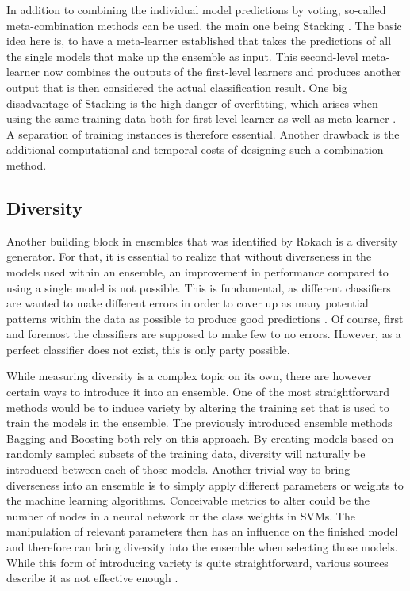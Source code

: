 In addition to combining the individual model predictions by voting, so-called meta-combination methods can be used, the main one being Stacking \cite{rokach2010}. The basic idea here is, to have a meta-learner established that takes the predictions of all the single models that make up the ensemble as input. This second-level meta-learner now combines the outputs of the first-level learners and produces another output that is then considered the actual classification result. One big disadvantage of Stacking is the high danger of overfitting, which arises when using the same training data both for first-level learner as well as meta-learner \cite{zhou2012}. A separation of training instances is therefore essential. Another drawback is the additional computational and temporal costs of designing such a combination method.



\subsection{Diversity}

Another building block in ensembles that was identified by Rokach \cite{rokach2010} is a diversity generator. For that, it is essential to realize that without diverseness in the models used within an ensemble, an improvement in performance compared to using a single model is not possible. This is fundamental, as different classifiers are wanted to make different errors in order to cover up as many potential patterns within the data as possible to produce good predictions \cite{kuncheva2004}. Of course, first and foremost the classifiers are supposed to make few to no errors. However, as a perfect classifier does not exist, this is only party possible. 

While measuring diversity is a complex topic on its own, there are however certain ways to introduce it into an ensemble. One of the most straightforward methods would be to induce variety by altering the training set that is used to train the models in the ensemble. The previously introduced ensemble methods Bagging and Boosting both rely on this approach. By creating models based on randomly sampled subsets of the training data, diversity will naturally be introduced between each of those models. Another trivial way to bring diverseness into an ensemble is to simply apply different parameters or weights to the machine learning algorithms. Conceivable metrics to alter could be the number of nodes in a neural network or the class weights in SVMs. The manipulation of relevant parameters then has an influence on the finished model and therefore can bring diversity into the ensemble when selecting those models. While this form of introducing variety is quite straightforward, various sources describe it as not effective enough \cite{brown2005}.

